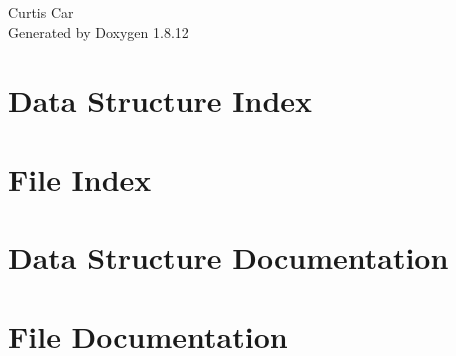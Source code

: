 \documentclass[twoside]{book}
\newcommand{\+}{\discretionary{\mbox{\scriptsize$\hookleftarrow$}}{}{}}
\newcommand{\clearemptydoublepage}{%
  \newpage{\pagestyle{empty}\cleardoublepage}%
}
\begin{document}
\hypersetup{pageanchor=false,
             bookmarksnumbered=true,
             pdfencoding=unicode
            }
\begin{titlepage}
\vspace*{7cm}
\begin{center}%
{\Large Curtis Car }\\
\vspace*{1cm}
{\large Generated by Doxygen 1.8.12}\\
\end{center}
\end{titlepage}
\clearemptydoublepage
{}
\tableofcontents
\clearemptydoublepage
{}
\hypersetup{pageanchor=true}

\chapter{Data Structure Index}

\chapter{File Index}

\chapter{Data Structure Documentation}


\chapter{File Documentation}






























































\backmatter
\newpage
{}
\clearemptydoublepage
{}
\printindex
\end{document}
